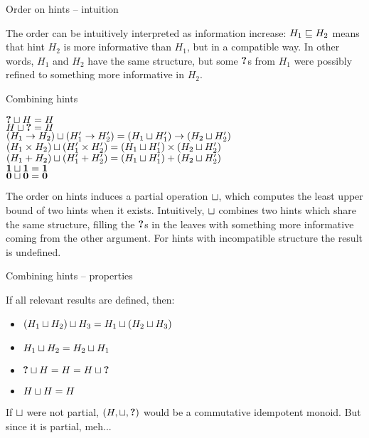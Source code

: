 \documentclass{beamer}
\begin{document}
\begin{frame}{Order on hints -- intuition}

The order can be intuitively interpreted as information increase: $H_1 \sqsubseteq H_2$ means that hint $H_2$ is more informative than $H_1$, but in a compatible way. In other words, $H_1$ and $H_2$ have the same structure, but some $\textbf{?}$s from $H_1$ were possibly refined to something more informative in $H_2$.

\end{frame}

\begin{frame}{Combining hints}

\begin{center}
  $\textbf{?} \sqcup H = H$ \\
  $H \sqcup \textbf{?} = H$ \\
  $(H_1 \to H_2) \sqcup (H'_1 \to H'_2) = (H_1 \sqcup H'_1) \to (H_2 \sqcup H'_2)$ \\
  $(H_1 \times H_2) \sqcup (H'_1 \times H'_2) = (H_1 \sqcup H'_1) \times (H_2 \sqcup H'_2)$ \\
  $(H_1 + H_2) \sqcup (H'_1 + H'_2) = (H_1 \sqcup H'_1) + (H_2 \sqcup H'_2)$ \\
  $\textbf{1} \sqcup \textbf{1} = \textbf{1}$ \\
  $\textbf{0} \sqcup \textbf{0} = \textbf{0}$
\end{center}

The order on hints induces a partial operation $\sqcup$, which computes the least upper bound of two hints when it exists. Intuitively, $\sqcup$ combines two hints which share the same structure, filling the $\textbf{?}$s in the leaves with something more informative coming from the other argument. For hints with incompatible structure the result is undefined.

\end{frame}

\begin{frame}{Combining hints -- properties}

If all relevant results are defined, then:

\begin{itemize}
  \item $(H_1 \sqcup H_2) \sqcup H_3 = H_1 \sqcup (H_2 \sqcup H_3)$
  \item $H_1 \sqcup H_2 = H_2 \sqcup H_1$
  \item $\textbf{?} \sqcup H = H = H \sqcup \textbf{?}$
  \item $H \sqcup H = H$
\end{itemize}

\vspace{2em}

If $\sqcup$ were not partial, $(H, \sqcup, \textbf{?})$ would be a commutative idempotent monoid. But since it is partial, meh...

\end{frame}
\end{document}
